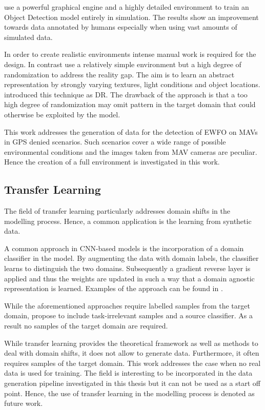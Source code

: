 \citeauthor{Johnson-Roberson2016} \cite{Johnson-Roberson2016} use a powerful graphical engine and a highly detailed environment to train an Object Detection model entirely in simulation. The results show an improvement towards data annotated by humans especially when using vast amounts of simulated data. 

In order to create realistic environments intense manual work is required for the design. In contrast \cite{Sadeghi2016, Tobin2017, Tremblay2018a} use a relatively simple environment but a high degree of randomization to address the reality gap. The aim is to learn an abstract representation by strongly varying textures, light conditions and object locations. \citeauthor{Tobin2017} introduced this technique as \ac{DR}. The drawback of the approach is that a too high degree of randomization may omit pattern in the target domain that could otherwise be exploited by the model. 

This work addresses the generation of data for the detection of \ac{EWFO} on \acp{MAV} in \ac{GPS} denied scenarios. Such scenarios cover a wide range of possible environmental conditions and the images taken from \ac{MAV} cameras are peculiar. Hence the creation of a full environment is investigated in this work. 


\subsection{Transfer Learning}

The field of transfer learning particularly addresses domain shifts in the modelling process. Hence, a common application is the learning from synthetic data.

A common approach in \ac{CNN}-based models is the incorporation of a domain classifier in the model. By augmenting the data with domain labels, the classifier learns to distinguish the two domains. Subsequently a gradient reverse layer is applied and thus the weights are updated in such a way that a domain agnostic representation is learned. Examples of the approach can be found in \cite{Chen2018c, Xu2017}.

While the aforementioned approaches require labelled samples from the target domain, \citeauthor{Peng2017} \cite{Peng2017} propose to include task-irrelevant samples and a source classifier. As a result no samples of the target domain are required.

While transfer learning provides the theoretical framework as well as methods to deal with domain shifts, it does not allow to generate data. Furthermore, it often requires samples of the target domain. This work addresses the case when no real data is used for training. The field is interesting to be incorporated in the data generation pipeline investigated in this thesis but it can not be used as a start off point. Hence, the use of transfer learning in the modelling process is denoted as future work.

